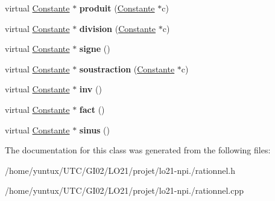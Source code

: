 \begin{DoxyCompactItemize}
\item 
\hypertarget{class_rationnel_aa1a21dae65f5fb48c56a376aea420bd6}{virtual \hyperlink{class_constante}{\-Constante} $\ast$ {\bfseries produit} (\hyperlink{class_constante}{\-Constante} $\ast$c)}\label{class_rationnel_aa1a21dae65f5fb48c56a376aea420bd6}

\item 
\hypertarget{class_rationnel_acf6c7167cfd8005ac723ce11feae2845}{virtual \hyperlink{class_constante}{\-Constante} $\ast$ {\bfseries division} (\hyperlink{class_constante}{\-Constante} $\ast$c)}\label{class_rationnel_acf6c7167cfd8005ac723ce11feae2845}

\item 
\hypertarget{class_rationnel_a12ba8bcf6c200e85c4d260ee0bbb78b6}{virtual \hyperlink{class_constante}{\-Constante} $\ast$ {\bfseries signe} ()}\label{class_rationnel_a12ba8bcf6c200e85c4d260ee0bbb78b6}

\item 
\hypertarget{class_rationnel_a268c0a861cdacea0593774b50a346a98}{virtual \hyperlink{class_constante}{\-Constante} $\ast$ {\bfseries soustraction} (\hyperlink{class_constante}{\-Constante} $\ast$c)}\label{class_rationnel_a268c0a861cdacea0593774b50a346a98}

\item 
\hypertarget{class_rationnel_a45dd892e3366ff9be810fde32739b899}{virtual \hyperlink{class_constante}{\-Constante} $\ast$ {\bfseries inv} ()}\label{class_rationnel_a45dd892e3366ff9be810fde32739b899}

\item 
\hypertarget{class_rationnel_a68ab5e97a92bb2a08d667861eb920052}{virtual \hyperlink{class_constante}{\-Constante} $\ast$ {\bfseries fact} ()}\label{class_rationnel_a68ab5e97a92bb2a08d667861eb920052}

\item 
\hypertarget{class_rationnel_a4082f9cbebb6d96c496552b93b106c99}{virtual \hyperlink{class_constante}{\-Constante} $\ast$ {\bfseries sinus} ()}\label{class_rationnel_a4082f9cbebb6d96c496552b93b106c99}

\end{DoxyCompactItemize}


\-The documentation for this class was generated from the following files\-:\begin{DoxyCompactItemize}
\item 
/home/yuntux/\-U\-T\-C/\-G\-I02/\-L\-O21/projet/lo21-\/npi./rationnel.\-h\item 
/home/yuntux/\-U\-T\-C/\-G\-I02/\-L\-O21/projet/lo21-\/npi./rationnel.\-cpp\end{DoxyCompactItemize}
